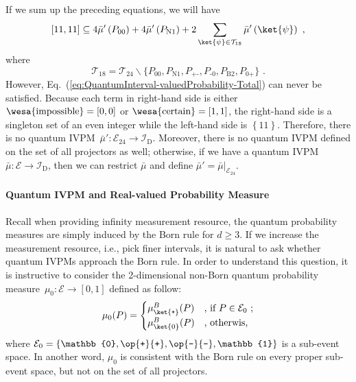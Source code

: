\documentclass[english,reprint, aps, prl,superscriptaddress, showpacs,
showkeys, longbibliography, amsmath, amssymb]{revtex4-1}
\theoremstyle{plain}
\theoremstyle{definition}
\newcommand{\events}{\ensuremath{\mathcal{E}}}
\newcommand{\imposs}{{\text{\wesa{impossible}}}}
\newcommand{\necess}{{\text{\wesa{certain}}}}
\newcommand{\proj}[1]{\op{#1}{#1}}
\newcommand{\ps}{\texttt{+}}
\newcommand{\ms}{\texttt{-}}
\begin{document}
If we sum up the preceding equations, we will have
\begin{equation}
\left[11,11\right]\subseteq4\bar{\mu}'\left(P_{00}\right)+4\bar{\mu}'\left(P_{\textrm{N}1}\right)+2\sum_{\ket{\psi}\in\mathcal{T}_{18}}\bar{\mu}'\left(\ket{\psi}\right)\textrm{ ,}\label{eq:QuantumInterval-valuedProbability-Total}
\end{equation}
where 
\begin{equation}
\mathcal{T}_{18}=\mathcal{T}_{24}\backslash\{P_{00},P_{\textrm{N}1},P_{\ps\ms},P_{\ms0},P_{\textrm{B}2},P_{0\ps}\}\textrm{ .}
\end{equation}
However, Eq.~(\ref{eq:QuantumInterval-valuedProbability-Total})
can never be satisfied. Because each term in right-hand side is either
$\imposs=\left[0,0\right]$ or $\necess=\left[1,1\right]$, the right-hand
side is a singleton set of an even integer while the left-hand side
is $\left\{ 11\right\} $. Therefore, there is no quantum IVPM~$\bar{\mu}':\events_{24}\rightarrow\mathscr{I}_{\mathrm{D}}$.
Moreover, there is no quantum IVPM defined on the set of all projectors
as well; otherwise, if we have a quantum IVPM~$\bar{\mu}:\events\rightarrow\mathscr{I}_{\mathrm{D}}$,
then we can restrict $\bar{\mu}$ and define $\bar{\mu}'=\left.\bar{\mu}\right|_{\events_{24}}$.

\paragraph{Quantum IVPM and Real-valued Probability Measure}

Recall when providing infinity measurement resource, the quantum probability
measures are simply induced by the Born rule for $d\ge3$. If we increase
the measurement resource, i.e., pick finer intervals, it is natural
to ask whether quantum IVPMs approach the Born rule. In order to understand
this question, it is instructive to consider the 2-dimensional non-Born
quantum probability measure~$\mu_{0}:\events\rightarrow[0,1]$ defined
as follow:
\begin{equation}
\mu_{0}(P)=\begin{cases}
\mu_{\ket{\ps}}^{B}(P) & \textrm{, if }P\in\events_{0}\textrm{ ;}\\
\mu_{\ket{0}}^{B}(P) & \textrm{, otherwis,}
\end{cases}
\end{equation}
where $\events_{0}=\left\{ \mathbb{0},\proj{\ps},\proj{\ms},\mathbb{1}\right\} $
is a sub-event space. In another word, $\mu_{0}$ is consistent with
the Born rule on every proper sub-event space, but not on the set
of all projectors.
\end{document}
